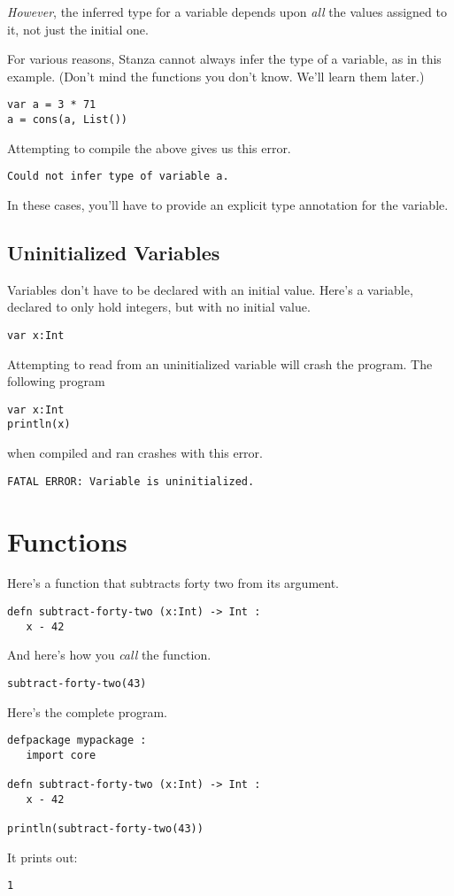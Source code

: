 \documentclass[10pt,oneside]{book}
\begin{document}
{\em However}, the inferred type for a variable depends upon {\em all} the values assigned to it, not just the initial one. 

For various reasons, Stanza cannot always infer the type of a variable, as in this example. (Don't mind the functions you don't know. We'll learn them later.) 
\begin{lstlisting}
var a = 3 * 71
a = cons(a, List())
\end{lstlisting}
Attempting to compile the above gives us this error.
\begin{lstlisting}
Could not infer type of variable a.
\end{lstlisting}

In these cases, you'll have to provide an explicit type annotation for the variable.

\subsection*{Uninitialized Variables}
Variables don't have to be declared with an initial value. Here's a variable, declared to only hold integers, but with no initial value.
\begin{lstlisting}
var x:Int
\end{lstlisting}

Attempting to read from an uninitialized variable will crash the program. The following program
\begin{lstlisting}
var x:Int
println(x)
\end{lstlisting}
when compiled and ran crashes with this error.
\begin{lstlisting}
FATAL ERROR: Variable is uninitialized.
\end{lstlisting}

\section{Functions}

Here's a function that subtracts forty two from its argument.
\begin{lstlisting}
defn subtract-forty-two (x:Int) -> Int :
   x - 42   
\end{lstlisting}

And here's how you {\em call} the function.
\begin{lstlisting}
subtract-forty-two(43)
\end{lstlisting}

Here's the complete program.
\begin{lstlisting}
defpackage mypackage :
   import core

defn subtract-forty-two (x:Int) -> Int :
   x - 42   

println(subtract-forty-two(43))
\end{lstlisting}
It prints out:
\begin{lstlisting}
1
\end{lstlisting}
\end{document}
